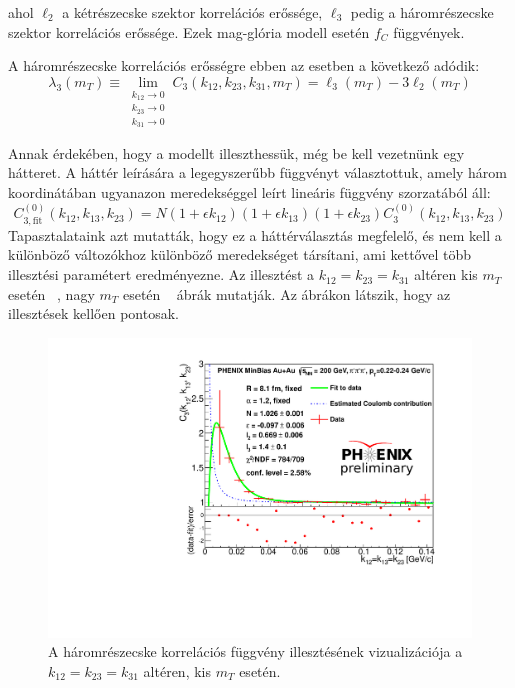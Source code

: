\documentclass[11pt,a4paper]{article}
\numberwithin{equation}{subsection}
\numberwithin{figure}{section}
\begin{document}
ahol $\ell_2$ a kétrészecske szektor korrelációs erőssége, $\ell_3$ pedig a háromrészecske szektor korrelációs erőssége. Ezek mag-glória modell esetén $f_C$ függvények.

A háromrészecske korrelációs erősségre ebben az esetben a következő adódik:
\begin{equation}
\lambda_3(m_T) \equiv \lim_{\substack{k_{12}\rightarrow 0\\ k_{23}\rightarrow 0\\ k_{31}\rightarrow 0}} C_3(k_{12},k_{23}, k_{31}, m_T) = \ell_3(m_T)-3\ell_2(m_T)
\end{equation}


Annak érdekében, hogy a modellt illeszthessük, még be kell vezetnünk egy hátteret. A háttér leírására a legegyszerűbb függvényt választottuk, amely három koordinátában ugyanazon meredekséggel leírt lineáris függvény szorzatából áll:
\begin{equation}
C_{3, \mathrm{fit}}^{(0)}(k_{12}, k_{13}, k_{23})= N(1+\epsilon k_{12})(1+\epsilon k_{13})(1+\epsilon k_{23})C_3^{(0)}(k_{12}, k_{13}, k_{23})
\end{equation}
Tapasztalataink azt mutatták, hogy ez a háttérválasztás megfelelő, és nem kell a különböző változókhoz különböző meredekséget társítani, ami kettővel több illesztési paramétert eredményezne. Az illesztést a $k_{12}=k_{23}=k_{31}$ altéren kis $m_T$ esetén ~, nagy $m_T$ esetén ~ ábrák mutatják. Az ábrákon látszik, hogy az illesztések kellően pontosak.


\begin{figure}[H]
\centering
\includegraphics[scale=0.6]{pic/res/diag_lowpt.pdf}
\centering
\caption{A háromrészecske korrelációs függvény illesztésének vizualizációja a $k_{12}=k_{23}=k_{31}$ altéren, kis $m_T$ esetén.}
\label{fig:fit1}
\end{figure}
\end{document}
